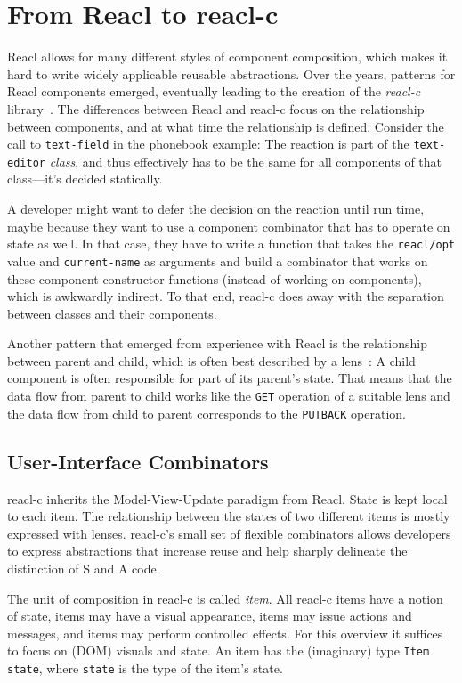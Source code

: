 \documentclass[sigplan,screen]{acmart}
\begin{document}
\section{From Reacl to reacl-c}
\label{sec:reacl-c}

Reacl allows for many different styles of component
composition, which makes it hard to write widely applicable reusable
abstractions. Over the years, patterns for
Reacl components emerged, eventually leading to the creation of the \textit{reacl-c}
library~\cite{reacl-c}.
The differences between Reacl and reacl-c focus on the relationship
between components, and at what time the relationship is
defined.  Consider the call to \texttt{text-field} in the
phonebook example:
The reaction is part of the \texttt{text-editor} \emph{class}, and
thus effectively has to be the same for all components of that
class---it's decided statically.

A developer might want to defer the decision on the reaction until run time,
maybe because they want to use a
component combinator that has to operate on state as well.
In that case, they have
to write a function that takes the \texttt{reacl/opt} value and
\texttt{current-name} as arguments and build a combinator
that works on these component constructor functions (instead of
working on components), which is awkwardly indirect.
To that end, reacl-c does away with the
separation between classes and their components.

Another pattern that emerged from experience with Reacl
is the relationship between parent
and child, which is often best described by a lens~\cite{Lenses}:
A child component is often responsible for part of its parent's
state. That means that the data flow from parent to child works like
the \texttt{GET} operation of a suitable lens and the data flow from
child to parent corresponds to the \texttt{PUTBACK} operation.

\subsection{User-Interface Combinators}

reacl-c inherits the Model-View-Update paradigm from Reacl.  State is kept local to each item. The relationship between
the states of two different items is mostly expressed with lenses.  reacl-c's small
set of flexible combinators allows developers to express abstractions
that increase reuse and help sharply delineate the distinction of S
and A code.

The unit of
composition in reacl-c is called \textit{item}. All reacl-c items have
a notion of state, items may have a visual appearance, items may issue
actions and messages, and items may perform controlled effects.  For
this overview it suffices to focus on (DOM) visuals and state.
An item has the (imaginary) type \texttt{Item
  state}, where \texttt{state} is the type of the item's state.
\end{document}
